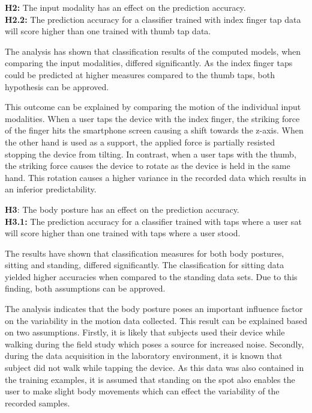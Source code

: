 \begin{center}
  \begin{framed}
    \textbf{H2:} The input modality has an effect on the prediction accuracy.\\
    \textbf{H2.2:} The prediction accuracy for a classifier trained with index finger tap data will score higher than one trained with thumb tap data.
  \end{framed}
\end{center}

The analysis has shown that classification results of the computed models, when comparing the input modalities, differed significantly. As the index finger taps could be predicted at higher measures compared to the thumb taps, both hypothesis can be approved.

This outcome can be explained by comparing the motion of the individual input modalities. When a user taps the device with the index finger, the striking force of the finger hits the smartphone screen causing a shift towards the z-axis. When the other hand is used as a support, the applied force is partially resisted stopping the device from tilting. In contrast, when a user taps with the thumb, the striking force causes the device to rotate as the device is held in the same hand. This rotation causes a higher variance in the recorded data which results in an inferior predictability.



\begin{center}
  \begin{framed}
    \textbf{H3}: The body posture has an effect on the prediction accuracy.\\
    \textbf{H3.1:} The prediction accuracy for a classifier trained with taps where a user sat will score higher than one trained with taps where a user stood.
  \end{framed}
\end{center}

The results have shown that classification measures for both body postures, sitting and standing, differed significantly. The classification for sitting data yielded higher accuracies when compared to the standing data sets. Due to this finding, both assumptions can be approved.

The analysis indicates that the body posture poses an important influence factor on the variability in the motion data collected. This result can be explained based on two assumptions. Firstly, it is likely that subjects used their device while walking during the field study which poses a source for increased noise. Secondly, during the data acquisition in the laboratory environment, it is known that subject did not walk while tapping the device. As this data was also contained in the training examples, it is assumed that standing on the spot also enables the user to make slight body movements which can effect the variability of the recorded samples.

